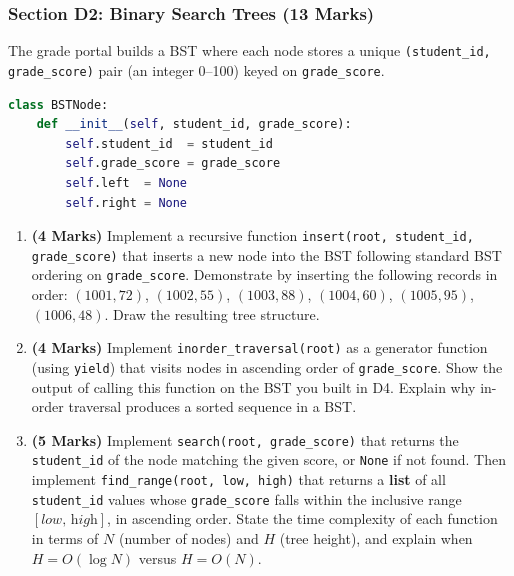 \documentclass[11pt,a4paper]{article}
\begin{document}
\vspace{0.5cm}
\subsubsection*{Section D2: Binary Search Trees (13 Marks)}

The grade portal builds a BST where each node stores a unique \texttt{(student\_id, grade\_score)} pair (an integer 0--100) keyed on \texttt{grade\_score}.

\begin{lstlisting}[language=Python]
class BSTNode:
    def __init__(self, student_id, grade_score):
        self.student_id  = student_id
        self.grade_score = grade_score
        self.left  = None
        self.right = None
\end{lstlisting}

\begin{enumerate}[label=\textbf{D\arabic*.}, resume]
    \item \textbf{(4 Marks)} Implement a recursive function \texttt{insert(root, student\_id, grade\_score)} that inserts a new node into the BST following standard BST ordering on \texttt{grade\_score}. Demonstrate by inserting the following records in order: $(1001, 72)$, $(1002, 55)$, $(1003, 88)$, $(1004, 60)$, $(1005, 95)$, $(1006, 48)$. Draw the resulting tree structure.

    \item \textbf{(4 Marks)} Implement \texttt{inorder\_traversal(root)} as a generator function (using \texttt{yield}) that visits nodes in ascending order of \texttt{grade\_score}. Show the output of calling this function on the BST you built in D4. Explain why in-order traversal produces a sorted sequence in a BST.

    \item \textbf{(5 Marks)} Implement \texttt{search(root, grade\_score)} that returns the \texttt{student\_id} of the node matching the given score, or \texttt{None} if not found. Then implement \texttt{find\_range(root, low, high)} that returns a \textbf{list} of all \texttt{student\_id} values whose \texttt{grade\_score} falls within the inclusive range $[\textit{low},\, \textit{high}]$, in ascending order. State the time complexity of each function in terms of $N$ (number of nodes) and $H$ (tree height), and explain when $H = O(\log N)$ versus $H = O(N)$.
\end{enumerate}

\newpage

\end{document}
